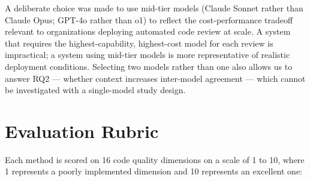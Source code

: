 \documentclass[12pt]{report}
\begin{document}
A deliberate choice was made to use mid-tier models (Claude Sonnet rather than Claude Opus; GPT-4o rather than o1) to reflect the cost-performance tradeoff relevant to organizations deploying automated code review at scale. A system that requires the highest-capability, highest-cost model for each review is impractical; a system using mid-tier models is more representative of realistic deployment conditions. Selecting two models rather than one also allows us to answer RQ2 --- whether context increases inter-model agreement --- which cannot be investigated with a single-model study design.

\section{Evaluation Rubric}

Each method is scored on 16 code quality dimensions on a scale of 1 to 10, where 1 represents a poorly implemented dimension and 10 represents an excellent one:
\end{document}
